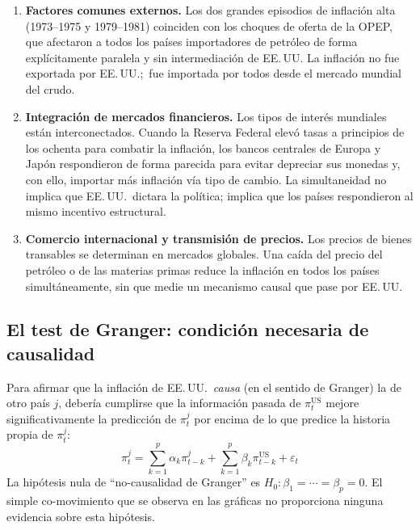 \documentclass[12pt, letterpaper]{article}
\theoremstyle{remark}
\begin{document}
\begin{enumerate}[leftmargin=1.8em, itemsep=6pt]
  \item \textbf{Factores comunes externos.} Los dos grandes episodios de
    inflaci\'on alta (1973--1975 y 1979--1981) coinciden con los choques
    de oferta de la OPEP, que afectaron a todos los pa\'ises importadores
    de petr\'oleo de forma expl\'icitamente paralela y sin intermediaci\'on
    de EE.\,UU. La inflaci\'on no fue exportada por EE.\,UU.;\ fue
    importada por todos desde el mercado mundial del crudo.

  \item \textbf{Integraci\'on de mercados financieros.} Los tipos de inter\'es
    mundiales est\'an interconectados. Cuando la Reserva Federal elev\'o
    tasas a principios de los ochenta para combatir la inflaci\'on, los
    bancos centrales de Europa y Jap\'on respondieron de forma parecida
    para evitar depreciar sus monedas y, con ello, importar m\'as inflaci\'on
    v\'ia tipo de cambio. La simultaneidad no implica que EE.\,UU.\ dictara
    la pol\'itica; implica que los pa\'ises respondieron al mismo incentivo
    estructural.

  \item \textbf{Comercio internacional y transmisi\'on de precios.} Los precios
    de bienes transables se determinan en mercados globales. Una ca\'ida del
    precio del petr\'oleo o de las materias primas reduce la inflaci\'on en
    todos los pa\'ises simult\'aneamente, sin que medie un mecanismo causal
    que pase por EE.\,UU.
\end{enumerate}

\subsection{El test de Granger: condici\'on necesaria de causalidad}

Para afirmar que la inflaci\'on de EE.\,UU.\ \emph{causa} (en el sentido
de Granger) la de otro pa\'is $j$, deber\'ia cumplirse que la informaci\'on
pasada de $\pi_t^{\text{US}}$ mejore significativamente la predicci\'on
de $\pi_t^j$ por encima de lo que predice la historia propia de $\pi_t^j$:
\begin{equation}
  \pi_t^j = \sum_{k=1}^p \alpha_k \pi_{t-k}^j
          + \sum_{k=1}^p \beta_k \pi_{t-k}^{\text{US}}
          + \varepsilon_t
  \label{eq:granger}
\end{equation}
La hip\'otesis nula de ``no-causalidad de Granger'' es $H_0: \beta_1 = \cdots = \beta_p = 0$.
El simple co-movimiento que se observa en las gr\'aficas no proporciona
ninguna evidencia sobre esta hip\'otesis.
\end{document}
